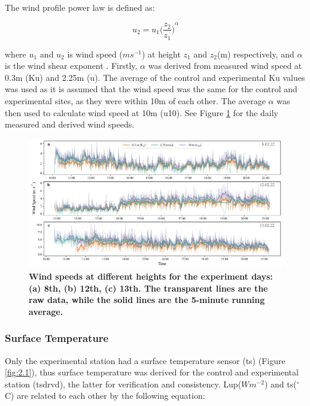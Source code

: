 \documentclass[final,3p,times,authoryear]{elsarticle}
\begin{document}
The wind profile power law is defined as:

\begin{equation}
u_{2} = u_{1}  { \bigg( \frac{ z_{2} }{ z_{1} } \bigg) } ^{\alpha}
\label{eq:7.4}
\end{equation}


where $u_{1}$ and $u_{2}$ is wind speed ($ms^{-1}$) at height $z_{1}$ and $z_{2}$(m) respectively, and $\alpha$ is the wind shear exponent \citep{Manwell2010}. Firstly, $\alpha$ was derived from measured wind speed at 0.3m (\gls{Ku}) and 2.25m (\gls{u}). The average of the control and experimental \gls{Ku} values was used as it is assumed that the wind speed was the same for the control and experimental sites, as they were within 10m of each other. The average $\alpha$ was then used to calculate wind speed at 10m (\gls{u10}). See Figure \ref{fig:7.7} for the daily measured and derived wind speeds.

\begin{figure}
\centering
\includegraphics[trim={0 0 0 0},clip,scale=1.0]{pict024.png}
\caption{\bf Wind speeds at different heights for the experiment days: (a) 8th, (b) 12th, (c) 13th. The transparent lines are the raw data, while the solid lines are the 5-minute running average.}
 \label{fig:7.7}
\end{figure}



\subsubsection{Surface Temperature}\label{sec:appendix7.4.2}

Only the experimental station had a surface temperature sensor (\gls{ts}) (Figure \ref{fig:2.1}), thus surface temperature was derived for the control and experimental station (\gls{tsdrvd}), the latter for verification and consistency. \gls{Lup}($Wm^{-2}$) and \gls{ts}($^{\circ}$C) are related to each other by the following equation:
\end{document}
